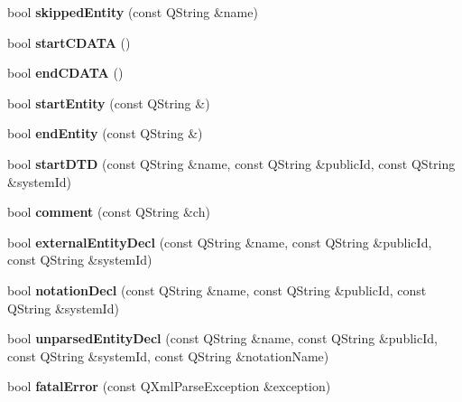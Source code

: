 \begin{DoxyCompactItemize}
\item 
\hypertarget{classKoXmlHandler_ad91dfa18bdeee332929c8828b38bc9de}{
bool {\bfseries skippedEntity} (const QString \&name)}
\label{classKoXmlHandler_ad91dfa18bdeee332929c8828b38bc9de}

\item 
\hypertarget{classKoXmlHandler_a6234bf0c3b52550d35e0f83e72df8af2}{
bool {\bfseries startCDATA} ()}
\label{classKoXmlHandler_a6234bf0c3b52550d35e0f83e72df8af2}

\item 
\hypertarget{classKoXmlHandler_ade57a52cc7a22fd822c2ffdf9979bbd8}{
bool {\bfseries endCDATA} ()}
\label{classKoXmlHandler_ade57a52cc7a22fd822c2ffdf9979bbd8}

\item 
\hypertarget{classKoXmlHandler_ad52050066ebf723ae988af50aef7a412}{
bool {\bfseries startEntity} (const QString \&)}
\label{classKoXmlHandler_ad52050066ebf723ae988af50aef7a412}

\item 
\hypertarget{classKoXmlHandler_ad2bea71b4881570bf10bd185e82c8f7e}{
bool {\bfseries endEntity} (const QString \&)}
\label{classKoXmlHandler_ad2bea71b4881570bf10bd185e82c8f7e}

\item 
\hypertarget{classKoXmlHandler_a359cc358f2ce935e21be20b3952270fc}{
bool {\bfseries startDTD} (const QString \&name, const QString \&publicId, const QString \&systemId)}
\label{classKoXmlHandler_a359cc358f2ce935e21be20b3952270fc}

\item 
\hypertarget{classKoXmlHandler_a3ee86334caadf373d3c6b36647ae7215}{
bool {\bfseries comment} (const QString \&ch)}
\label{classKoXmlHandler_a3ee86334caadf373d3c6b36647ae7215}

\item 
\hypertarget{classKoXmlHandler_aaa64d3cd3549e43dbee2ffc84c91a33e}{
bool {\bfseries externalEntityDecl} (const QString \&name, const QString \&publicId, const QString \&systemId)}
\label{classKoXmlHandler_aaa64d3cd3549e43dbee2ffc84c91a33e}

\item 
\hypertarget{classKoXmlHandler_ae7801327058c3cbfac77ae5c802ce7bc}{
bool {\bfseries notationDecl} (const QString \&name, const QString \&publicId, const QString \&systemId)}
\label{classKoXmlHandler_ae7801327058c3cbfac77ae5c802ce7bc}

\item 
\hypertarget{classKoXmlHandler_aa3119903735c2bf535f2b05ec138e01c}{
bool {\bfseries unparsedEntityDecl} (const QString \&name, const QString \&publicId, const QString \&systemId, const QString \&notationName)}
\label{classKoXmlHandler_aa3119903735c2bf535f2b05ec138e01c}

\item 
\hypertarget{classKoXmlHandler_afd3bb959ccc2d7e3393452e1ddea6c19}{
bool {\bfseries fatalError} (const QXmlParseException \&exception)}
\label{classKoXmlHandler_afd3bb959ccc2d7e3393452e1ddea6c19}

\end{DoxyCompactItemize}

